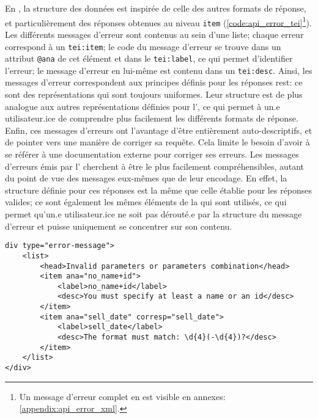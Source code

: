 En \xmltei{}, la structure des données est inspirée de celle des autres formats de réponse, et particulièrement des réponses obtenues au niveau \texttt{item} (\ref{code:api_error_tei}\footnote{
	Un message d'erreur complet en \json{} est visible en annexes: \ref{appendix:api_error_xml}.
}). Les différents messages d'erreur sont contenus au sein d'une liste; chaque erreur correspond à un \texttt{tei:item}; le code du message d'erreur se trouve dans un attribut \texttt{@ana} de cet élément et dans le \texttt{tei:label}, ce qui permet d'identifier l'erreur; le message d'erreur en lui-même est contenu dans un \texttt{tei:desc}. Ainsi, les messages d'erreur correspondent aux principes définis pour les réponses \gls{rest}: ce sont des représentations qui sont toujours uniformes. Leur structure est de plus analogue aux autres représentations définies pour l'\api{}, ce qui permet à un.e utilisateur.ice de comprendre plus facilement les différents formats de réponse. Enfin, ces messages d'erreurs ont l'avantage d'être entièrement auto-descriptifs, et de pointer vers une manière de corriger sa requête. Cela limite le besoin d'avoir à se référer à une documentation externe pour corriger ses erreurs. Les messages d'erreurs émis par l'\api{} cherchent à être le plus facilement compréhensibles, autant du point de vue des messages eux-mêmes que de leur encodage. En effet, la structure définie pour ces réponses est la même que celle établie pour les réponses valides; ce sont également les mêmes éléments de la \tei{} qui sont utilisés, ce qui permet qu'un.e utilisateur.ice ne soit pas dérouté.e par la structure du message d'erreur et puisse uniquement se concentrer sur son contenu.

\begin{listing}[h]
	\begin{verbatim}
div type="error-message">
	<list>
		<head>Invalid parameters or parameters combination</head>
		<item ana="no_name+id">
			<label>no_name+id</label>
			<desc>You must specify at least a name or an id</desc>
		</item>
		<item ana="sell_date" corresp="sell_date">
			<label>sell_date</label>
			<desc>The format must match: \d{4}(-\d{4})?</desc>
		</item>
	</list>
</div>
	\end{verbatim}
	\caption{Corps de réponse en cas d'erreur de la part du client en \xmltei{}}
	\label{code:api_error_tei}
\end{listing}

